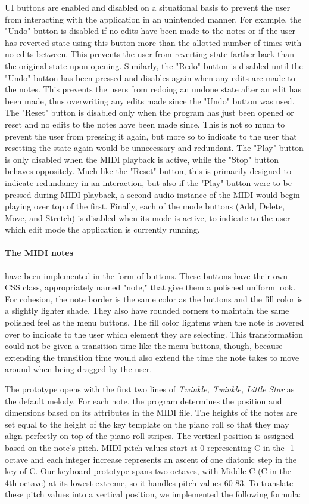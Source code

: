 UI buttons are enabled and disabled on a situational basis to prevent the user from interacting
with the application in an unintended manner. For example, the "Undo" button is disabled if no
edits have been made to the notes or if the user has reverted state using this button more than
the allotted number of times with no edits between. This prevents the user from reverting state
farther back than the original state upon opening. Similarly, the "Redo" button is disabled until
the "Undo" button has been pressed and disables again when any edits are made to the notes. This
prevents the users from redoing an undone state after an edit has been made, thus overwriting any
edits made since the "Undo" button was used. The "Reset" button is disabled only when the program
has just been opened or reset and no edits to the notes have been made since. This is not so much
to prevent the user from pressing it again, but more so to indicate to the user that resetting the
state again would be unnecessary and redundant. The "Play" button is only disabled when
the MIDI playback is active, while the "Stop" button behaves oppositely. Much like the "Reset"
button, this is primarily designed to indicate redundancy in an interaction, but also if the "Play"
button were to be pressed during MIDI playback, a second audio instance of the MIDI would begin
playing over top of the first. Finally, each of the mode buttons (Add, Delete, Move, and Stretch)
is disabled when its mode is active, to indicate to the user which edit mode the application is
currently running.

\paragraph{The MIDI notes} have been implemented in the form of buttons. These buttons have their own CSS
class, appropriately named "note," that give them a polished uniform look. For cohesion, the note
border is the same color as the buttons and the fill color is a slightly lighter shade. They also
have rounded corners to maintain the same polished feel as the menu buttons. The fill color
lightens when the note is hovered over to indicate to the user which element they are selecting.
This transformation could not be given a transition time like the menu buttons, though, because
extending the transition time would also extend the time the note takes to move around when being
dragged by the user.

The prototype opens with the first two lines of \textit{Twinkle, Twinkle, Little Star} as the default
melody. For each note, the program determines the position and dimensions based on its attributes
in the MIDI file. The heights of the notes are set equal to the height of the key template on the
piano roll so that they may align perfectly on top of the piano roll stripes. The vertical position
is assigned based on the note's pitch. MIDI pitch values start at 0 representing C in the -1 octave
and each integer increase represents an ascent of one diatonic step in the key of C. Our keyboard
prototype spans two octaves, with Middle C (C in the 4th octave) at its lowest extreme, so it
handles pitch values 60-83. To translate these pitch values into a vertical position, we
implemented the following formula:

